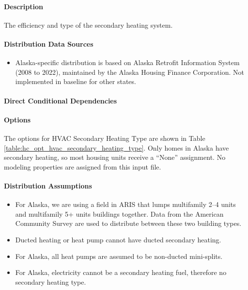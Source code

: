 \paragraph{Description}
% 
The efficiency and type of the secondary heating system.

\paragraph{Distribution Data Sources}
% 
\begin{itemize}
\item Alaska-specific distribution is based on Alaska Retrofit Information System (2008 to 2022), maintained by the Alaska Housing Finance Corporation. Not implemented in baseline for other states.
\end{itemize}

\paragraph{Direct Conditional Dependencies}


\paragraph{Options}
The options for HVAC Secondary Heating Type are shown in Table \ref{table:hc_opt_hvac_secondary_heating_type}. Only homes in Alaska have secondary heating, so most housing units receive a ``None'' assignment. No modeling properties are assigned from this input file.



\paragraph{Distribution Assumptions}
% 
\begin{itemize}
    \item For Alaska, we are using a field in ARIS that lumps multifamily 2--4 units and multifamily 5+ units buildings together. Data from the American Community Survey are used to distribute between these two building types.
    \item Ducted heating or heat pump cannot have ducted secondary heating.
    \item For Alaska, all heat pumps are assumed to be non-ducted mini-splits. 
    \item For Alaska, electricity cannot be a secondary heating fuel, therefore no secondary heating type. 
\end{itemize}
